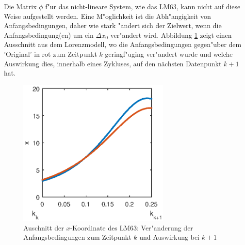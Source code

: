 \begin{refsection}
Die Matrix $\phi$ f"ur das nicht-lineare System, wie das LM63, kann nicht auf diese  Weise aufgestellt werden. Eine M"oglichkeit ist die Abh"angigkeit von Anfangsbedingungen, daher wie stark "andert sich der Zielwert, wenn die Anfangsbedingung(en) um ein $\Delta x_{0}$ ver"andert wird. Abbildung \ref{kalman:AblnachAnf} zeigt einen Ausschnitt aus dem Lorenzmodell, wo die Anfangsbedingungen gegen"uber dem 'Original' in rot zum Zeitpunkt $k$ geringf"uging ver"andert wurde und welche Auswirkung dies, innerhalb eines Zykluses, auf den nächsten Datenpunkt $k+1$ hat.

\begin{figure}
\centering
\includegraphics[width=3in]{kalman/figures/ablnachAnf2.eps}
\caption{Auschnitt der $x$-Koordinate des LM63: Ver"anderung der Anfangsbedingungen zum Zeitpunkt $k$ und Auswirkung bei $k+1$}
\label{kalman:AblnachAnf}
\end{figure}


\end{refsection}
